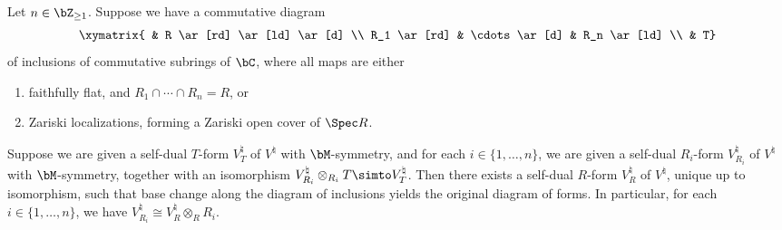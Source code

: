 \begin{lem} \label{lem:unique-R-forms-with-monster-symmetry} Let $n \in \bZ_{\geq 1}$. Suppose we have a commutative diagram
\begin{gather*} \xymatrix{ & R \ar[rd] \ar[ld] \ar[d] \\ R_1 \ar[rd] & \cdots \ar[d] & R_n \ar[ld] \\ & T} \end{gather*}
of inclusions of commutative subrings of $\bC$, where all maps are either
\begin{enumerate}\itemsep=0pt
\item[$1)$] faithfully flat, and $R_1 \cap \cdots \cap R_n = R$, or
\item[$2)$] Zariski localizations, forming a Zariski open cover of $\Spec R$.
\end{enumerate}
Suppose we are given a self-dual $T$-form $V^\natural_T$ of $V^\natural$ with $\bM$-symmetry, and for each $i \in \{1,\ldots,n\}$, we are given a self-dual $R_i$-form $V^\natural_{R_i}$ of $V^\natural$ with $\bM$-symmetry, together with an isomorphism $V^\natural_{R_i} \otimes_{R_i} T \simto V^\natural_T$. Then there exists a self-dual $R$-form $V^\natural_R$ of $V^\natural$, unique up to isomorphism, such that base change along the diagram of inclusions yields the original diagram of forms. In particular, for each $i \in \{1, \ldots, n\}$, we have $V^\natural_{R_i} \cong V^\natural_R \otimes_{R} R_i$.
\end{lem}
